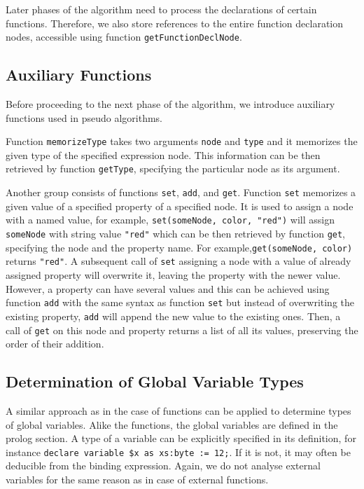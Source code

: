 Later phases of the algorithm need to process the declarations of certain functions. Therefore, we also store references to the entire function declaration nodes, accessible using function \texttt{getFunctionDeclNode}.

\subsection{Auxiliary Functions}
Before proceeding to the next phase of the algorithm, we introduce auxiliary functions used in pseudo algorithms.

Function \texttt{memorizeType} takes two arguments \texttt{node} and \texttt{type} and it memorizes the given type of the specified expression node. This information can be then retrieved by function \texttt{getType}, specifying the particular node as its argument.

Another group consists of functions \texttt{set}, \texttt{add}, and \texttt{get}. Function \texttt{set} memorizes a given value of a specified property of a specified node. It is used to assign a node with a named value, for example, \texttt{set(someNode, color, "red")} will assign \texttt{someNode} with string value \texttt{"red"} which can be then retrieved by function \texttt{get}, specifying the node and the property name. For example,\linebreak \texttt{get(someNode, color)} returns \texttt{"red"}. A subsequent call of \texttt{set} assigning a node with a value of already assigned property will overwrite it, leaving the property with the newer value. However, a property can have several values and this can be achieved using function \texttt{add} with the same syntax as function \texttt{set} but instead of overwriting the existing property, \texttt{add} will append the new value to the existing ones. Then, a call of \texttt{get} on this node and property returns a list of all its values, preserving the order of their addition.

\subsection{Determination of Global Variable Types}
A similar approach as in the case of functions can be applied to determine types of global variables. Alike the functions, the global variables are defined in the prolog section. A type of a variable can be explicitly specified in its definition, for instance \texttt{declare variable \$x as xs:byte := 12;}. If it is not, it may often be deducible from the binding expression. Again, we do not analyse external variables for the same reason as in case of external functions.

